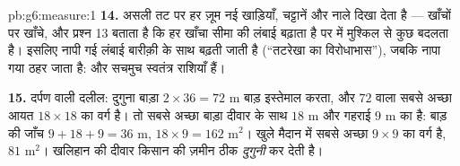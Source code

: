 \begin{solution}{pb:g6:measure:1}
\textbf{14.} असली तट पर हर ज़ूम नई खाड़ियाँ, चट्टानें और नाले
दिखा देता है --- खाँचों पर खाँचे, और प्रश्न 13 बताता है कि हर
खाँचा सीमा की लंबाई बढ़ाता है पर  में मुश्किल से कुछ
बदलता है। इसलिए नापी गई लंबाई बारीक़ी के साथ बढ़ती जाती है
(``तटरेखा का विरोधाभास''), जबकि नापा गया  ठहर जाता है:
 और  सचमुच स्वतंत्र राशियाँ हैं।

\textbf{15.} दर्पण वाली दलील: दुगुना बाड़ा
$2 \times 36 = 72$ m बाड़ इस्तेमाल करता, और  $72$ वाला
सबसे अच्छा आयत $18 \times 18$ का वर्ग है। तो सबसे अच्छा बाड़ा
दीवार के साथ $18$ m और गहराई $9$ m का है: बाड़ की जाँच
$9 + 18 + 9 = 36$ m,  $18 \times 9 = 162$ m$^2$। खुले
मैदान में सबसे अच्छा $9 \times 9$ का वर्ग है,  $81$ m$^2$।
खलिहान की दीवार किसान की ज़मीन ठीक \emph{दुगुनी} कर देती है।

\end{solution}
